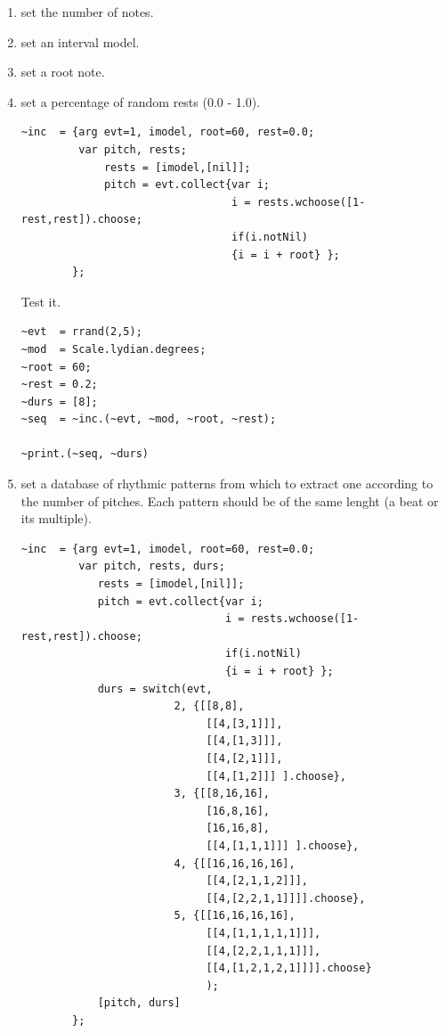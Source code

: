 \begin{enumerate}
\def\labelenumi{\arabic{enumi}.}
\tightlist
\item set the number of notes.
\item set an interval model. 
\item set a root note.
\item set a percentage of random rests (0.0 - 1.0).

\begin{lstlisting}[frame=single] 
~inc  = {arg evt=1, imodel, root=60, rest=0.0;
         var pitch, rests;
             rests = [imodel,[nil]];      
             pitch = evt.collect{var i; 
                                 i = rests.wchoose([1-rest,rest]).choose;
                                 if(i.notNil)
                                 {i = i + root} }; 
        };
\end{lstlisting}

Test it.

\begin{lstlisting}[frame=single] 
~evt  = rrand(2,5);
~mod  = Scale.lydian.degrees; 
~root = 60;
~rest = 0.2;
~durs = [8];
~seq  = ~inc.(~evt, ~mod, ~root, ~rest);

~print.(~seq, ~durs)
\end{lstlisting}

\item set a database of rhythmic patterns from which to extract one according to the number of pitches. Each pattern should be of the same lenght (a beat or its multiple).

\begin{lstlisting}[frame=single] 
~inc  = {arg evt=1, imodel, root=60, rest=0.0;
         var pitch, rests, durs;
            rests = [imodel,[nil]];      
            pitch = evt.collect{var i; 
                                i = rests.wchoose([1-rest,rest]).choose;
                                if(i.notNil)
                                {i = i + root} }; 
            durs = switch(evt,  
                        2, {[[8,8],
                             [[4,[3,1]]],
                             [[4,[1,3]]],
                             [[4,[2,1]]],
                             [[4,[1,2]]] ].choose},
                        3, {[[8,16,16],
                             [16,8,16],
                             [16,16,8],
                             [[4,[1,1,1]]] ].choose},
                        4, {[[16,16,16,16],
                             [[4,[2,1,1,2]]],   
                             [[4,[2,2,1,1]]]].choose},
                        5, {[[16,16,16,16],
                             [[4,[1,1,1,1,1]]],   
                             [[4,[2,2,1,1,1]]],
                             [[4,[1,2,1,2,1]]]].choose} 
                             );                   
            [pitch, durs] 
        };
\end{lstlisting}


\end{enumerate}
